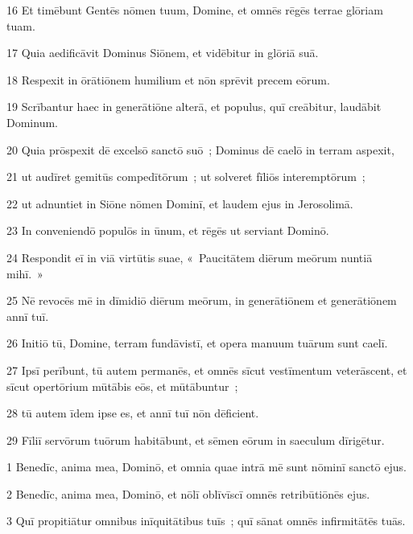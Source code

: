 \psalmVerse
  {\phantom{0}16}
  {Et timēbunt Gentēs nōmen tuum, Domine, et omnēs rēgēs terrae glōriam tuam.}


\psalmVerse
  {\phantom{0}17}
  {Quia aedificāvit Dominus Siōnem, et vidēbitur in glōriā suā.}


\psalmVerse
  {\phantom{0}18}
  {Respexit in ōrātiōnem humilium et nōn sprēvit precem eōrum.}


\psalmVerse
  {\phantom{0}19}
  {Scrībantur haec in generātiōne alterā, et populus, quī creābitur, laudābit Dominum.}


\psalmVerse
  {\phantom{0}20}
  {Quia prōspexit dē excelsō sanctō suō~; Dominus dē caelō in terram aspexit,}


\psalmVerse
  {\phantom{0}21}
  {ut audīret gemitūs compedītōrum~; ut solveret fīliōs interemptōrum~;}


\psalmVerse
  {\phantom{0}22}
  {ut adnuntiet in Siōne nōmen Dominī, et laudem ejus in Jerosolimā.}


\psalmVerse
  {\phantom{0}23}
  {In conveniendō populōs in ūnum, et rēgēs ut serviant Dominō.}


\psalmVerse
  {\phantom{0}24}
  {Respondit eī in viā virtūtis suae, «~Paucitātem diērum meōrum nuntiā mihī.~»}


\psalmVerse
  {\phantom{0}25}
  {Nē revocēs mē in dīmidiō diērum meōrum, in generātiōnem et generātiōnem annī tuī.}


\psalmVerse
  {\phantom{0}26}
  {Initiō tū, Domine, terram fundāvistī, et opera manuum tuārum sunt caelī.}


\psalmVerse
  {\phantom{0}27}
  {Ipsī perībunt, tū autem permanēs, et omnēs sīcut vestīmentum veterāscent, et sīcut opertōrium mūtābis eōs, et mūtābuntur~;}


\psalmVerse
  {\phantom{0}28}
  {tū autem īdem ipse es, et annī tuī nōn dēficient.}


\psalmVerse
  {\phantom{0}29}
  {Fīliī servōrum tuōrum habitābunt, et sēmen eōrum in saeculum dīrigētur.}



\psalmVerse
  {\phantom{00}1}
  {Benedīc, anima mea, Dominō, et omnia quae intrā mē sunt nōminī sanctō ejus.}


\psalmVerse
  {\phantom{00}2}
  {Benedīc, anima mea, Dominō, et nōlī oblīvīscī omnēs retribūtiōnēs ejus.}


\psalmVerse
  {\phantom{00}3}
  {Quī propitiātur omnibus inīquitātibus tuīs~; quī sānat omnēs infirmitātēs tuās.}


